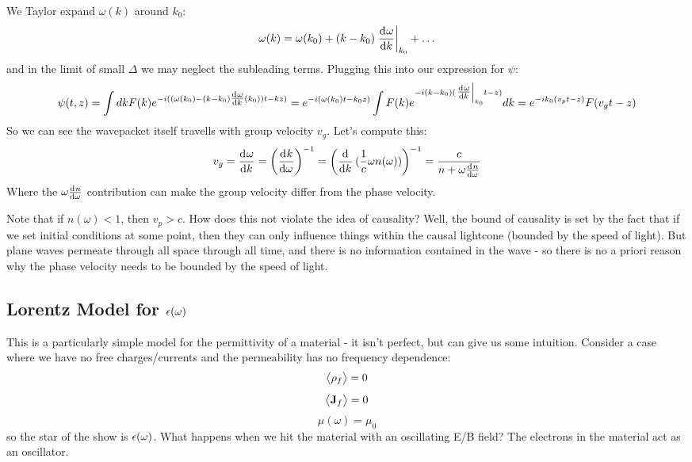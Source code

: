 We Taylor expand $\omega(k)$ around $k_0$:
\begin{equation}
    \omega(k) = \omega(k_0) + (k- k_0)\left.\dod{\omega}{k}\right|_{k_0} + \ldots
\end{equation}
and in the limit of small $\Delta$ we may neglect the subleading terms. Plugging this into our expression for $\psi$:
\begin{equation}
    \psi(t, z) =  \int dk F(k)e^{-i((\omega(k_0) - (k-k_0)\od{\omega}{k}(k_0))t - kz)} = e^{-i(\omega(k_0)t - k_0z)}\int F(k)e^{-i(k - k_0)(\left.\od{\omega}{k}\right|_{k_0}t - z)}dk = e^{-ik_0(v_p t - z)}F(v_g t - z)
\end{equation}
So we can see the wavepacket itself travells with group velocity $v_g$. Let's compute this:
\begin{equation}
    v_g = \dod{\omega}{k} = \left(\dod{k}{\omega}\right)^{-1} = \left(\dod{}{k}(\frac{1}{c}\omega n(\omega))\right)^{-1} = \frac{c}{n + \omega\od{n}{\omega}}
\end{equation}
Where the $\omega \od{n}{\omega}$ contribution can make the group velocity differ from the phase velocity.

Note that if $n(\omega) < 1$, then $v_p > c$. How does this not violate the idea of causality? Well, the bound of causality is set by the fact that if we set initial conditions at some point, then they can only influence things within the causal lightcone (bounded by the speed of light). But plane waves permeate through all space through all time, and there is no information contained in the wave - so there is no a priori reason why the phase velocity needs to be bounded by the speed of light.

\subsection{Lorentz Model for $\epsilon(\omega)$}
This is a particularly simple model for the permittivity of a material - it isn't perfect, but can give us some intuition. Consider a case where we have no free charges/currents and the permeability has no frequency dependence:
\begin{equation}
    \left< \rho_f \right> = 0
\end{equation}
\begin{equation}
    \left< \mathbf{J}_f \right> = 0
\end{equation}
\begin{equation}
    \mu(\omega) = \mu_0
\end{equation}
so the star of the show is $\epsilon(\omega)$. What happens when we hit the material with an oscillating E/B field? The electrons in the material act as an oscillator.


